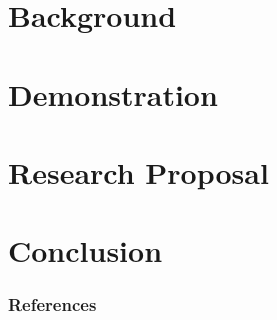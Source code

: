 \documentclass[11pt,handout]{beamer}
\begin{document}
\section{Background}
%
%
%
%


\section{Demonstration}
%

\section{Research Proposal}
%
%
%

\section{Conclusion}
%
%


\begin{frame}[allowframebreaks]
  \frametitle{References}
  
  {\footnotesize  }
\end{frame}

\end{document}
